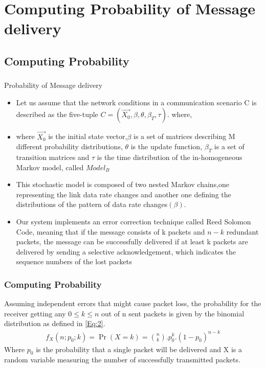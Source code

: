 \documentclass{beamer}
\providecommand{\pr}[1]{\ensuremath{\Pr\left(#1\right)}}
\begin{document}
\section{Computing Probability of Message delivery}
\subsection*{Computing Probability}
\begin{frame}[fragile]
\frametitle{}
\begin{block}{Probability of Message delivery}
\begin{itemize}
    \item Let us assume that the network conditions in a communication scenario C is described as the five-tuple $C= (\overrightarrow{X_0},\beta,\theta,\beta_T,\tau)$.
    where,
    \item where $\overrightarrow{X_0}$ is the initial state vector,$\beta$ is a set of matrices describing M different probability distributions, $\theta$ is the update function, $\beta_T$ is a set of transition matrices and $\tau$ is the time distribution of the in-homogeneous Markov model, called $Model_B$
    \item This stochastic model is composed of two nested Markov chains,one representing the link data rate changes and another one defining the distributions of the pattern of data rate changes$(\beta)$.
    \item Our system implements an error correction technique called Reed Solomon Code, meaning that if the message consists of k packets and $n-k$ redundant packets, the message can be successfully delivered if at least k packets are delivered by sending a selective acknowledgement, which indicates the sequence numbers of the lost packets
\end{itemize}
\end{block}
\end{frame}
\begin{frame}[fragile]
\frametitle{Computing Probability}
Assuming independent errors that might cause packet loss,
the probability for the receiver getting any $0 \leq k \leq n$ out of
n sent packets is given by the binomial distribution as defined
in \eqref{Eq:2}.
\begin{align}
    f_X(n;p_0;k) = \pr{X = k} = {n \choose k} . p_0^{k} . (1-p_0)^{n-k} \label{Eq:2}
\end{align}
Where $p_0$ is the probability that a single packet will be delivered and X is a random variable measuring the number of successfully transmitted packets.
\end{frame}
\end{document}
